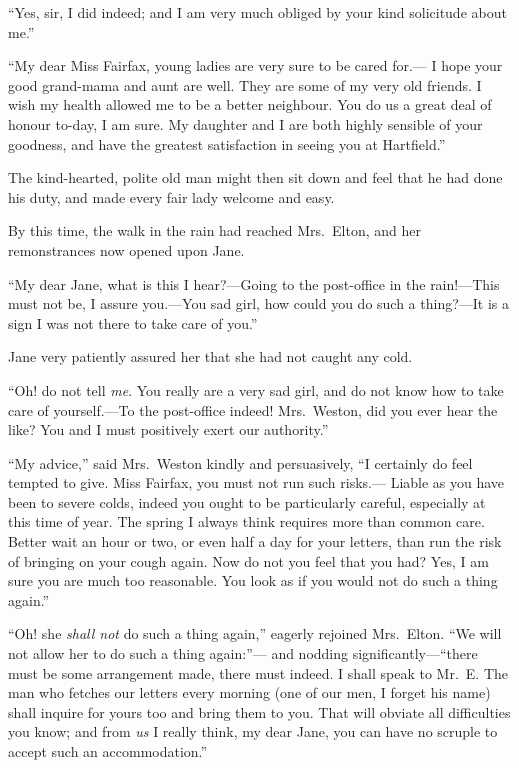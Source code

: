 ``Yes, sir, I did indeed; and I am very much obliged by your kind
solicitude about me.''

``My dear Miss Fairfax, young ladies are very sure to be cared for.---%
I hope your good grand-mama and aunt are well.  They are some
of my very old friends.  I wish my health allowed me to be a
better neighbour.  You do us a great deal of honour to-day, I am sure.
My daughter and I are both highly sensible of your goodness,
and have the greatest satisfaction in seeing you at Hartfield.''

The kind-hearted, polite old man might then sit down and feel
that he had done his duty, and made every fair lady welcome and easy.

By this time, the walk in the rain had reached Mrs.\ Elton,
and her remonstrances now opened upon Jane.

``My dear Jane, what is this I hear?---Going to the post-office
in the rain!---This must not be, I assure you.---You sad girl,
how could you do such a thing?---It is a sign I was not there
to take care of you.''

Jane very patiently assured her that she had not caught any cold.

``Oh! do not tell \emph{me}.  You really are a very sad girl, and do not
know how to take care of yourself.---To the post-office indeed!
Mrs.\ Weston, did you ever hear the like?  You and I must positively
exert our authority.''

``My advice,'' said Mrs.\ Weston kindly and persuasively, ``I certainly
do feel tempted to give.  Miss Fairfax, you must not run such risks.---%
Liable as you have been to severe colds, indeed you ought
to be particularly careful, especially at this time of year.
The spring I always think requires more than common care.
Better wait an hour or two, or even half a day for your letters,
than run the risk of bringing on your cough again.  Now do not you
feel that you had?  Yes, I am sure you are much too reasonable.
You look as if you would not do such a thing again.''

``Oh! she \emph{shall not} do such a thing again,'' eagerly rejoined
Mrs.\ Elton.  ``We will not allow her to do such a thing again:''---%
and nodding significantly---``there must be some arrangement made,
there must indeed.  I shall speak to Mr.\ E. The man who fetches
our letters every morning (one of our men, I forget his name)
shall inquire for yours too and bring them to you.  That will obviate
all difficulties you know; and from \emph{us} I really think, my dear Jane,
you can have no scruple to accept such an accommodation.''

